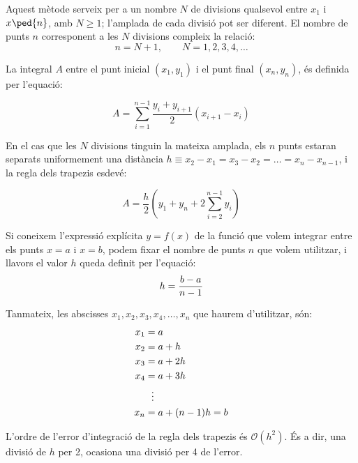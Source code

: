 Aquest mètode serveix per a un nombre  $N$ de divisions qualsevol  entre $x_1$ i $x\ped{n}$, amb $N \geq 1$; l'amplada de cada divisió pot ser diferent.  El nombre de punts $n$ corresponent a les $N$ divisions compleix la relació: 
\begin{equation}
n = N+1, \qquad N = 1, 2, 3, 4, \dots
\end{equation}

La integral $A$ entre el punt inicial $(x_1, y_1)$ i el punt final $(x_n, y_n)$, és definida per l'equació:

 \begin{equation}\label{eq:trap-uneven}
    A = \sum_{i=1}^{n-1} \frac{y_i + y_{i+1}}{2} (x_{i+1}-x_i)
 \end{equation}

En el cas que les $N$ divisions tinguin la mateixa amplada, els  $n$ punts estaran separats uniformement una distància $h \equiv x_2-x_1 = x_3-x_2 = \dots = x_n-x_{n-1}$, i la regla dels trapezis esdevé:

 \begin{equation}\label{eq:trap}
    A = \frac{h}{2} \left( y_1 + y_n + 2 \sum_{i=2}^{n-1} y_i \right)
 \end{equation}

Si coneixem l'expressió explícita $y=f(x)$ de la funció que volem integrar entre els punts $x=a$ i $x=b$, podem fixar el nombre de punts $n$ que volem utilitzar, i llavors el valor $h$ queda definit per l'equació:
\begin{equation}\label{eq:trap_1}
    h = \frac{b-a}{n-1}\\
\end{equation}

Tanmateix, les abscisses $x_1, x_2, x_3,x_4, \dotsc , x_n$ que haurem d'utilitzar, són:
\begin{align}\label{eq:trap_2}
    x_1 &= a \notag\\
    x_2 &= a + h \notag\\
    x_3 &= a + 2 h \notag\\
    x_4 &= a + 3 h\\
    {} &\hspace{1.5ex}\vdots {} \notag\\
    x_n &= a + (n-1)h =b \notag
\end{align}

L'ordre de l'error d'integració de la regla dels trapezis és $\mathscr{O}(h^2)$. És a dir, una divisió de $h$ per 2, ocasiona una divisió per 4 de l'error.

